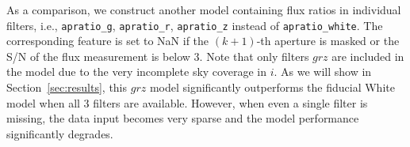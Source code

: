 \documentclass[twocolumn,tighten]{aastex631}
\begin{document}
\begin{CJK*}{UTF8}{gbsn}
As a comparison, we construct another model containing flux ratios in individual filters, i.e., \texttt{apratio\_g}, \texttt{apratio\_r}, \texttt{apratio\_z} instead of \texttt{apratio\_white}.
The corresponding feature is set to NaN if the $(k+1)$-th aperture is masked or the S/N of the flux measurement is below 3.
Note that only filters $grz$ are included in the model due to the very incomplete sky coverage in $i$. As we will show in Section~\ref{sec:results}, this $grz$ model significantly outperforms the fiducial White model when all 3 filters are available. However, when even a single filter is missing, the data input becomes very sparse and the model performance significantly degrades.


\end{CJK*}
\end{document}
